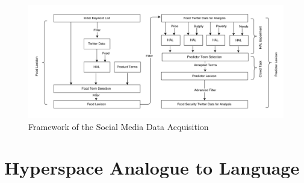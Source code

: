\begin{figure}[H]
        \centering
         \includegraphics[width=1\textwidth ]{img/lex/lexica_architecture}
              
        \caption{Framework of the Social Media Data Acquisition}
        \label{fig:lex_arch}
\end{figure}








\section{Hyperspace Analogue to Language}
\label{hal}


